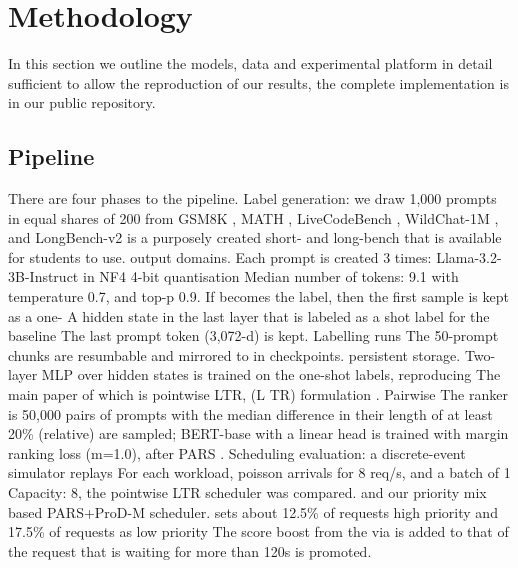 \documentclass[conference]{IEEEtran}
\begin{document}
\section{Methodology}
\label{sec:methodology}
In this section we outline the models, data and experimental platform in detail sufficient to allow the reproduction of our results, the complete implementation is in our public repository.

\subsection{Pipeline}
There are four phases to the pipeline. Label generation: we draw
1,000 prompts in equal shares of 200 from GSM8K \cite{cobbe2021gsm8k},
MATH \cite{hendrycks2021math}, LiveCodeBench \cite{jain2025livecodebench}, WildChat-1M \cite{zhao2024wildchat}, and
LongBench-v2 \cite{bai2025longbench} is a purposely created short- and long-bench that is available for students to use. output domains. Each prompt is created 3 times: Llama-3.2-3B-Instruct \cite{dubey2024llama3} in NF4 4-bit quantisation \cite{dettmers2023qlora} Median number of tokens: 9.1 with temperature 0.7, and top-p 0.9. If becomes the label, then the first sample is kept as a one-
A hidden state in the last layer that is labeled as a shot label for the baseline The last prompt token (3,072-d) is kept. Labelling runs
The 50-prompt chunks are resumbable and mirrored to in checkpoints. persistent storage. Two-layer MLP over
hidden states is trained on the one-shot labels, reproducing
The main paper of which is pointwise LTR, (L TR) formulation \cite{fu2024efficient}. Pairwise The ranker is 50,000 pairs of prompts with the median difference in their length of at least 20\% (relative) are sampled; BERT-base with a linear head is trained with margin ranking loss (m=1.0), after PARS \cite{tao2025pars}. Scheduling evaluation: a discrete-event simulator replays For each workload, poisson arrivals for 8 req/s, and a batch of 1 Capacity: 8, the pointwise LTR scheduler was compared.
and our priority mix based PARS+ProD-M scheduler. sets about 12.5\% of requests high priority and 17.5\% of requests as low priority The score boost from the via is added to that of the request that is waiting for more than 120s is promoted.
\end{document}
